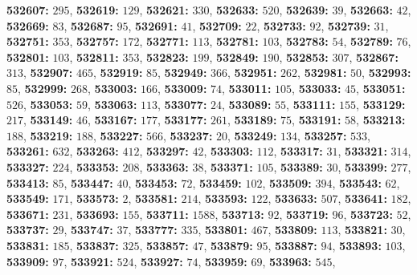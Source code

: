 \textsf{\bfseries 532607:} $295$, \textsf{\bfseries 532619:} $129$, \textsf{\bfseries 532621:} $330$, \textsf{\bfseries 532633:} $520$, \textsf{\bfseries 532639:} $39$, \textsf{\bfseries 532663:} $42$, \textsf{\bfseries 532669:} $83$, \textsf{\bfseries 532687:} $95$, \textsf{\bfseries 532691:} $41$, \textsf{\bfseries 532709:} $22$, \textsf{\bfseries 532733:} $92$, \textsf{\bfseries 532739:} $31$, \textsf{\bfseries 532751:} $353$, \textsf{\bfseries 532757:} $172$, \textsf{\bfseries 532771:} $113$, \textsf{\bfseries 532781:} $103$, \textsf{\bfseries 532783:} $54$, \textsf{\bfseries 532789:} $76$, \textsf{\bfseries 532801:} $103$, \textsf{\bfseries 532811:} $353$, \textsf{\bfseries 532823:} $199$, \textsf{\bfseries 532849:} $190$, \textsf{\bfseries 532853:} $307$, \textsf{\bfseries 532867:} $313$, \textsf{\bfseries 532907:} $465$, \textsf{\bfseries 532919:} $85$, \textsf{\bfseries 532949:} $366$, \textsf{\bfseries 532951:} $262$, \textsf{\bfseries 532981:} $50$, \textsf{\bfseries 532993:} $85$, \textsf{\bfseries 532999:} $268$, \textsf{\bfseries 533003:} $166$, \textsf{\bfseries 533009:} $74$, \textsf{\bfseries 533011:} $105$, \textsf{\bfseries 533033:} $45$, \textsf{\bfseries 533051:} $526$, \textsf{\bfseries 533053:} $59$, \textsf{\bfseries 533063:} $113$, \textsf{\bfseries 533077:} $24$, \textsf{\bfseries 533089:} $55$, \textsf{\bfseries 533111:} $155$, \textsf{\bfseries 533129:} $217$, \textsf{\bfseries 533149:} $46$, \textsf{\bfseries 533167:} $177$, \textsf{\bfseries 533177:} $261$, \textsf{\bfseries 533189:} $75$, \textsf{\bfseries 533191:} $58$, \textsf{\bfseries 533213:} $188$, \textsf{\bfseries 533219:} $188$, \textsf{\bfseries 533227:} $566$, \textsf{\bfseries 533237:} $20$, \textsf{\bfseries 533249:} $134$, \textsf{\bfseries 533257:} $533$, \textsf{\bfseries 533261:} $632$, \textsf{\bfseries 533263:} $412$, \textsf{\bfseries 533297:} $42$, \textsf{\bfseries 533303:} $112$, \textsf{\bfseries 533317:} $31$, \textsf{\bfseries 533321:} $314$, \textsf{\bfseries 533327:} $224$, \textsf{\bfseries 533353:} $208$, \textsf{\bfseries 533363:} $38$, \textsf{\bfseries 533371:} $105$, \textsf{\bfseries 533389:} $30$, \textsf{\bfseries 533399:} $277$, \textsf{\bfseries 533413:} $85$, \textsf{\bfseries 533447:} $40$, \textsf{\bfseries 533453:} $72$, \textsf{\bfseries 533459:} $102$, \textsf{\bfseries 533509:} $394$, \textsf{\bfseries 533543:} $62$, \textsf{\bfseries 533549:} $171$, \textsf{\bfseries 533573:} $2$, \textsf{\bfseries 533581:} $214$, \textsf{\bfseries 533593:} $122$, \textsf{\bfseries 533633:} $507$, \textsf{\bfseries 533641:} $182$, \textsf{\bfseries 533671:} $231$, \textsf{\bfseries 533693:} $155$, \textsf{\bfseries 533711:} $1588$, \textsf{\bfseries 533713:} $92$, \textsf{\bfseries 533719:} $96$, \textsf{\bfseries 533723:} $52$, \textsf{\bfseries 533737:} $29$, \textsf{\bfseries 533747:} $37$, \textsf{\bfseries 533777:} $335$, \textsf{\bfseries 533801:} $467$, \textsf{\bfseries 533809:} $113$, \textsf{\bfseries 533821:} $30$, \textsf{\bfseries 533831:} $185$, \textsf{\bfseries 533837:} $325$, \textsf{\bfseries 533857:} $47$, \textsf{\bfseries 533879:} $95$, \textsf{\bfseries 533887:} $94$, \textsf{\bfseries 533893:} $103$, \textsf{\bfseries 533909:} $97$, \textsf{\bfseries 533921:} $524$, \textsf{\bfseries 533927:} $74$, \textsf{\bfseries 533959:} $69$, \textsf{\bfseries 533963:} $545$, 
